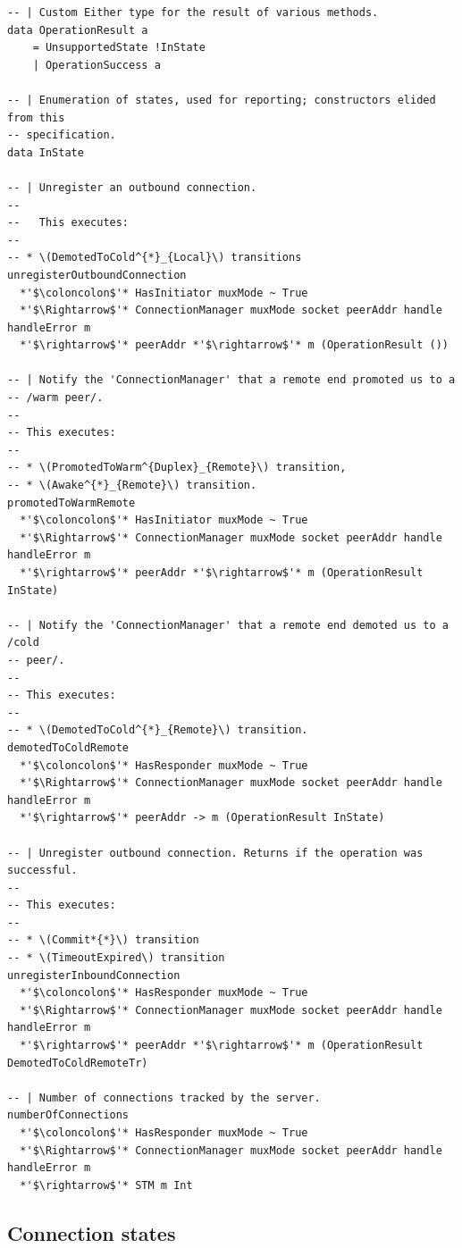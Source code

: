 \begin{lstlisting}
-- | Custom Either type for the result of various methods.
data OperationResult a
    = UnsupportedState !InState
    | OperationSuccess a

-- | Enumeration of states, used for reporting; constructors elided from this
-- specification.
data InState

-- | Unregister an outbound connection.
--
--   This executes:
--
-- * \(DemotedToCold^{*}_{Local}\) transitions
unregisterOutboundConnection
  *'$\coloncolon$'* HasInitiator muxMode ~ True
  *'$\Rightarrow$'* ConnectionManager muxMode socket peerAddr handle handleError m
  *'$\rightarrow$'* peerAddr *'$\rightarrow$'* m (OperationResult ())

-- | Notify the 'ConnectionManager' that a remote end promoted us to a
-- /warm peer/.
--
-- This executes:
--
-- * \(PromotedToWarm^{Duplex}_{Remote}\) transition,
-- * \(Awake^{*}_{Remote}\) transition.
promotedToWarmRemote
  *'$\coloncolon$'* HasInitiator muxMode ~ True
  *'$\Rightarrow$'* ConnectionManager muxMode socket peerAddr handle handleError m
  *'$\rightarrow$'* peerAddr *'$\rightarrow$'* m (OperationResult InState)

-- | Notify the 'ConnectionManager' that a remote end demoted us to a /cold
-- peer/.
--
-- This executes:
--
-- * \(DemotedToCold^{*}_{Remote}\) transition.
demotedToColdRemote
  *'$\coloncolon$'* HasResponder muxMode ~ True
  *'$\Rightarrow$'* ConnectionManager muxMode socket peerAddr handle handleError m
  *'$\rightarrow$'* peerAddr -> m (OperationResult InState)

-- | Unregister outbound connection. Returns if the operation was successful.
--
-- This executes:
--
-- * \(Commit*{*}\) transition
-- * \(TimeoutExpired\) transition
unregisterInboundConnection
  *'$\coloncolon$'* HasResponder muxMode ~ True
  *'$\Rightarrow$'* ConnectionManager muxMode socket peerAddr handle handleError m
  *'$\rightarrow$'* peerAddr *'$\rightarrow$'* m (OperationResult DemotedToColdRemoteTr)

-- | Number of connections tracked by the server.
numberOfConnections
  *'$\coloncolon$'* HasResponder muxMode ~ True
  *'$\Rightarrow$'* ConnectionManager muxMode socket peerAddr handle handleError m
  *'$\rightarrow$'* STM m Int
\end{lstlisting}

\subsection{Connection states}\label{sec:connection-state}

